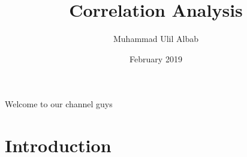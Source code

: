 \documentclass{article}
\title{Correlation Analysis}
\author{Muhammad Ulil Albab }
\date{February 2019}
\begin{document}
Welcome to our channel guys
\maketitle

\section{Introduction}
\end{document}
